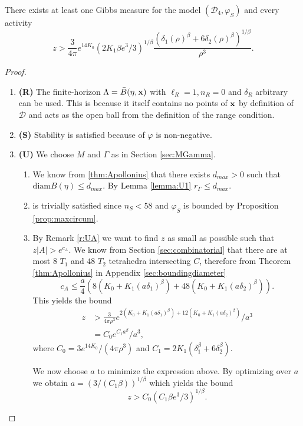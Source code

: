 \begin{theorem}\label{thm:E1}
	There exists at least one Gibbs measure for the model $(\mathcal D_4,\varphi_S)$ and every activity 
	$$z> \frac{3}{4\pi}e^{14 K_0}   (2K_1 \beta e^3/3)^{1/\beta} \frac{(\delta_1(\rho)^\beta + 6\delta_2(\rho)^\beta)^{1/\beta}}{\rho^3}.$$
\end{theorem}
\begin{proof}
\begin{enumerate}[]
	\item \textbf{(R)} The finite-horizon $\Lambda = \bar B(\eta,{\mathbf{x}})$ with $\ell_R = 1, n_R = 0$ and $\delta_R$ arbitrary can be used. This is because it itself contains no points of ${\mathbf{x}}$ by definition of $\mathcal D$ and acts as the open ball from the definition of the range condition.
	\item \textbf{(S)} Stability is satisfied because of $\varphi$ is non-negative.
	\item \textbf{(U)} We choose $M$ and $\Gamma$ as in Section \ref{sec:MGamma}.
		\begin{enumerate}[(U1)]
			\item We know from \ref{thm:Apollonius} that there exists $d_{max}>0$ such that $\text{diam}B(\eta)\leq d_{max}$. By Lemma \ref{lemma:U1} $r_\Gamma\leq d_{max}.$
			\item is trivially satisfied since $n_S < 58$ and $\varphi_S$ is bounded by Proposition \ref{prop:maxcircum}.
			\item By Remark \ref{r:UA} we want to find $z$ as small as possible such that $z|A|>e^{c_A}.$ We know from Section \ref{sec:combinatorial} that there are at most $8$ $T_1$ and $48$ $T_2$ tetrahedra intersecting $C$, therefore from Theorem \ref{thm:Apollonius} in Appendix \ref{sec:boundingdiameter}
				$$c_A \leq \frac a4 (8( K_0 + K_1 (a\delta_1)^\beta) + 48( K_0 + K_1 (a\delta_2)^\beta) ).$$
				This yields the bound
				\begin{align*}z &> \frac{3} {4\pi\rho^3}e^{2(K_0 + K_1 (a\delta_1)^\beta) + 12(K_0 + K_1(a \delta_2)^\beta)} / a^3  \\
					&= C_0 e^{C_1 a^\beta} / a^3,  
				\end{align*}
				where $C_0 = 3e^{14K_0}/(4\pi \rho^3)$ and $C_1 = 2K_1(\delta_1^\beta + 6 \delta_2^\beta)$.

				We now choose $a$ to minimize the expression above. By optimizing over $a$ we obtain $a=(3/(C_1 \beta))^{1/\beta}$ which yields the bound 
				$$z> C_0(C_1 \beta e^3/ 3 )^{1/\beta}.$$
		\end{enumerate}
\end{enumerate}
\end{proof}




